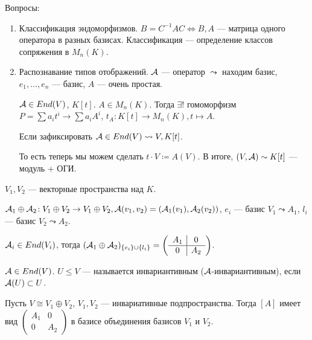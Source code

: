 Вопросы:
\begin{enumerate}
    \item Классификация эндоморфизмов. $B = C^{-1}AC \iff B, A$ --- матрица одного оператора в разных базисах. Классификация --- определение классов сопряжения в  $M_n(K)$.
    \item Распознавание типов отображений. $\mathcal{A}$ --- оператор  $\leadsto$ находим базис,  $e_1, \ldots, e_n$ --- базис, $A$ --- очень простая. 

        $\mathcal{A} \in End(V)$, $K[t]$.  $A \in M_n(K)$. Тогда  $\exists!$ гомоморфизм  $P = \sum a_i t^i \to \sum a_i A^i$, $t_A\!: K[t] \to M_n(K), t \mapsto A$. 

        Если зафиксировать $\mathcal{A} \in End(V) \leadsto V, K[t]$.

        То есть теперь мы можем сделать  $t \cdot V \coloneqq A(V)$. В итоге,  $(V, \mathcal{A}) \sim K[t]$ --- модуль + ОГИ.
\end{enumerate}
\begin{example}
    $V_1, V_2$ --- векторные пространства над $K$.  

    $\mathcal{A}_1 \oplus \mathcal{A}_2\!: V_1 \oplus V_2 \to V_1 \oplus V_2, \mathcal{A}(v_1, v_2) = (\mathcal{A}_1(v_1), \mathcal{A}_2(v_2))$, $e_i$ --- базис  $V_1 \leadsto A_1$,  $l_i$ --- базис $V_2 \leadsto A_2$.

    $\mathcal{A}_i \in End(V_i)$, тогда  $(\mathcal{A}_1 \oplus \mathcal{A}_2)_{\{e_i\} \cup \{l_i\}} = \left(\begin{array}{c|c} A_1 & 0 \\ \hline 0 & A_2 \end{array} \right)$.
\end{example}
\begin{definition}
    $\mathcal{A} \in End(V)$.  $U \le V$ --- называется инвариантивным ($\mathcal{A}$-инвариантивным), если $\mathcal{A}(U) \subset U$.
\end{definition}

Пусть $V \cong V_1 \oplus V_2$, $V_1, V_2$ --- инвариативные подпространства. Тогда $[A]$ имеет вид  $\left(\begin{array}{c|c} A_1 & 0 \\ \hline 0 & A_2 \end{array} \right)$ в базисе объединения базисов $V_1$ и $V_2$.

